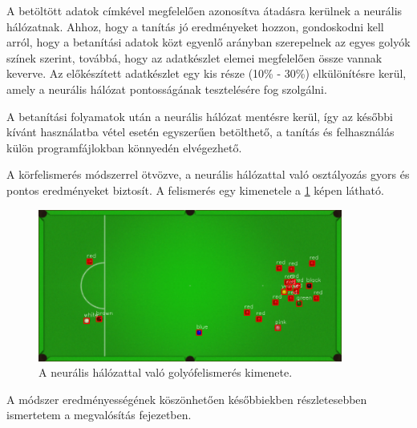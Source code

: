 \par A betöltött adatok címkével megfelelően azonosítva átadásra kerülnek a neurális hálózatnak. Ahhoz, hogy a tanítás jó eredményeket hozzon, gondoskodni kell arról, hogy a betanítási adatok közt egyenlő arányban szerepelnek az egyes golyók színek szerint, továbbá, hogy az adatkészlet elemei megfelelően össze vannak keverve. Az előkészített adatkészlet egy kis része (10\% - 30\%) elkülönítésre kerül, amely a neurális hálózat pontosságának tesztelésére fog szolgálni.
\par A betanítási folyamatok után a neurális hálózat mentésre kerül, így az későbbi kívánt használatba vétel esetén egyszerűen betölthető, a tanítás és felhasználás külön programfájlokban könnyedén elvégezhető.
\par A körfelismerés módszerrel ötvözve, a neurális hálózattal való osztályozás gyors és pontos eredményeket biztosít. A felismerés egy kimenetele a \ref{fig:felismert_asztal} képen látható.

\begin{figure}[!ht]
    \centering
    \includegraphics[width=100mm, keepaspectratio]{figures/recognised_table.png}
    \caption{A neurális hálózattal való golyófelismerés kimenete.}
    \label{fig:felismert_asztal}
\end{figure}

\par A módszer eredményességének köszönhetően későbbiekben részletesebben ismertetem a megvalósítás fejezetben.
